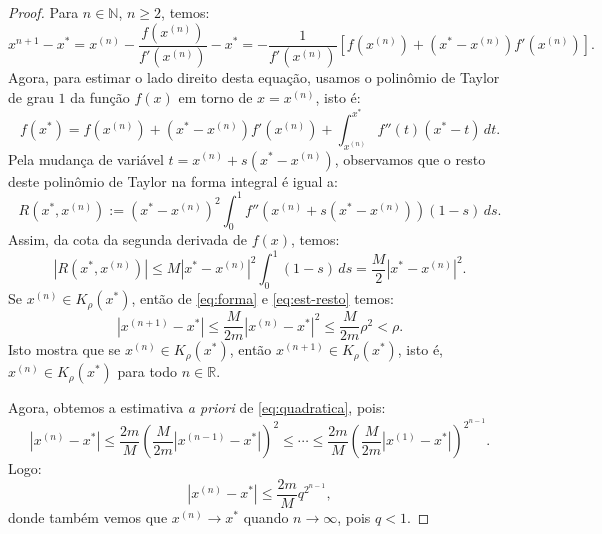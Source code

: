 \begin{proof}
  Para $n\in\mathbb{N}$, $n\geq 2$, temos:
  \begin{equation}\label{eq:forma}
    x^{n+1}-x^* = x^{(n)} - \frac{f(x^{(n)})}{f'(x^{(n)})} - x^* = -\frac{1}{f'(x^{(n)})}\left[f(x^{(n)})+(x^*-x^{(n)})f'(x^{(n)})\right].
  \end{equation}
Agora, para estimar o lado direito desta equação, usamos o polinômio de Taylor de grau $1$ da função $f(x)$ em torno de $x = x^{(n)}$, isto é:
\begin{equation}
  f(x^*) = f(x^{(n)}) + (x^* - x^{(n)})f'(x^{(n)}) + \int_{x^{(n)}}^{x^*} f''(t)(x^* - t)\,dt.
\end{equation}
Pela mudança de variável $t = x^{(n)} + s(x^* - x^{(n)})$, observamos que o resto deste polinômio de Taylor na forma integral é igual a:
\begin{equation}
  R(x^*,x^{(n)}) := (x^* - x^{(n)})^2\int_0^1 f''\left(x^{(n)} + s(x^* - x^{(n)})\right)(1-s)\,ds.
\end{equation}
Assim, da cota da segunda derivada de $f(x)$, temos:
\begin{equation}\label{eq:est-resto}
  |R(x^*,x^{(n)})| \leq M|x^*-x^{(n)}|^2\int_0^1 (1-s)\,ds = \frac{M}{2}|x^* - x^{(n)}|^2.
\end{equation}\label{eq:quadratica}
Se $x^{(n)}\in K_\rho(x^*)$, então de \eqref{eq:forma} e \eqref{eq:est-resto} temos:
\begin{equation}
  |x^{(n+1)} - x^*| \leq \frac{M}{2m}|x^{(n)} - x^*|^2 \leq \frac{M}{2m}\rho^2 < \rho.
\end{equation}
Isto mostra que se $x^{(n)}\in K_\rho(x^*)$, então $x^{(n+1)}\in K_\rho(x^*)$, isto é, $x^{(n)}\in K_\rho(x^*)$ para todo $n\in\mathbb{R}$.

Agora, obtemos a estimativa \emph{a priori} de \eqref{eq:quadratica}, pois:
\begin{equation}
  |x^{(n)} - x^*| \leq \frac{2m}{M}\left(\frac{M}{2m}|x^{(n-1)}-x^*|\right)^2 \leq \cdots \leq \frac{2m}{M}\left(\frac{M}{2m} |x^{(1)}-x^*|\right)^{2^{n-1}}.
\end{equation}
Logo:
\begin{equation}
  |x^{(n)} - x^*| \leq \frac{2m}{M}q^{2^{n-1}},
\end{equation}
donde também vemos que $x^{(n)}\to x^*$ quando $n\to\infty$, pois $q < 1$.


\end{proof}
